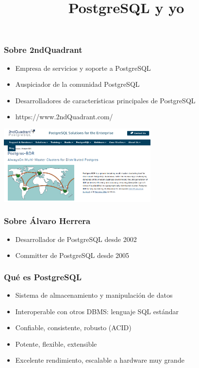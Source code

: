 \title{PostgreSQL y yo}
\newcommand{\putcollection}{
  \put(0,10){
    \parbox{\textwidth}{
      \fontsize{30}{30}\selectfont
      Álvaro Herrera \\
      PostgreSQL developer -- 2ndQuadrant Inc.\\
      UbuCon LA, agosto 2019
    }
  }
}
\newcommand{\insertcopyright}{}
\renewcommand{\insertcopyright}{(C) 2ndQuadrant Limited 2008-2019}
\date{}



  \begin{frame}[plain]
    \titlepage
  \end{frame}

\begin{frame}
\frametitle{Sobre 2ndQuadrant}

\begin{itemize}
\item Empresa de servicios y soporte a PostgreSQL
\item Auspiciador de la comunidad PostgreSQL
\item Desarrolladores de características principales de PostgreSQL
\item https://www.2ndQuadrant.com/
\end{itemize}

\vfill
\hfill  \includegraphics[width=0.6\textwidth]{2ndq-website.png}

\end{frame}

\begin{frame}
\frametitle{Sobre Álvaro Herrera}

\begin{itemize}
\item Desarrollador de PostgreSQL desde 2002
\item Committer de PostgreSQL desde 2005
\end{itemize}

\end{frame}

\begin{frame}
 \frametitle{Qué es PostgreSQL}

\begin{itemize}
\item Sistema de almacenamiento y manipulación de datos
\item Interoperable con otros DBMS: lenguaje SQL estándar
\item Confiable, consistente, robusto (ACID)
\item Potente, flexible, extensible
\item Excelente rendimiento, escalable a hardware muy grande
\end{itemize}
\end{frame}

